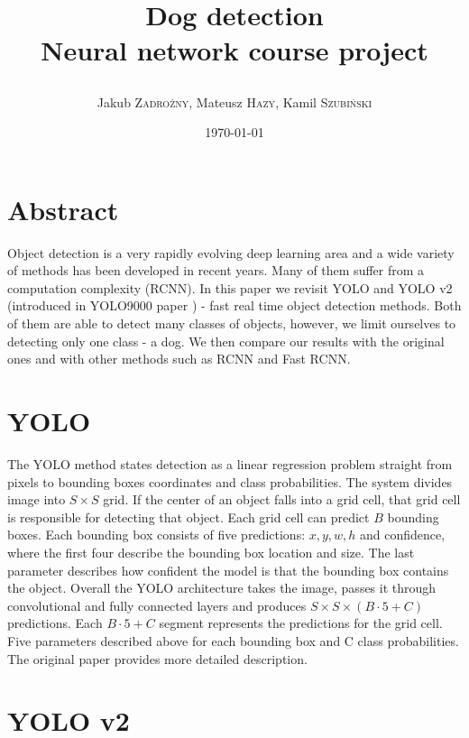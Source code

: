 \documentclass{article}
\title
{
	\LARGE\textbf{Dog detection} \\ 
	Neural network course project \\
	\author
	{ 
		Jakub \textsc{Zadrożny}, 
		Mateusz \textsc{Hazy},
		Kamil \textsc{Szubiński}
	}
}
\date{\today}
\begin{document}
\maketitle

\section*{Abstract}

Object detection is a very rapidly evolving deep learning area and a wide variety of methods has been developed in recent years. Many of them suffer from a computation complexity (RCNN). In this paper we revisit YOLO \cite{yolo} and YOLO v2 (introduced in YOLO9000 paper \cite{yolo9000}) - fast real time object detection methods. Both of them are able to detect many classes of objects, however, we limit ourselves to detecting only one class - a dog. We then compare our results with the original ones and with other methods such as RCNN and Fast RCNN.

\section*{YOLO}

The YOLO method states detection as a linear regression problem straight from pixels to bounding boxes coordinates and class probabilities. The system divides image into $ S \times S $ grid. If the center of an object falls into a grid cell, that grid cell is responsible for detecting that object. Each grid cell can predict $B$ bounding boxes. Each bounding box consists of five predictions: $x, y, w, h$ and confidence, where the first four describe the bounding box location and size. The last parameter describes how confident the model is that the bounding box contains the object. Overall the YOLO architecture takes the image, passes it through convolutional and fully connected layers and produces $S \times S \times (B \cdot  5 + C)$ predictions. Each $B \cdot 5 + C$ segment represents the predictions for the grid cell. Five parameters described above for each bounding box and C class probabilities. The original paper \cite{yolo} provides more detailed description.

\section*{YOLO v2}
\end{document}
